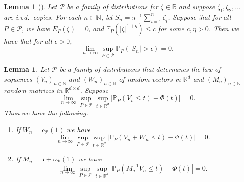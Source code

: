 \documentclass[aos]{imsart}
\renewcommand{\Pr}{\mathbb{P}}
\newcommand{\R}{\mathbb{R}}
\newcommand{\E}{\mathbb{E}}
\newtheorem{lemma}[theorem]{Lemma}
\begin{document}
	\begin{lemma}[{\citet[Supp. Lem.~19]{ShahGCM}}]
		\label{lem:uniformWLLN}
		Let $\mathcal{P}$ be a family of distributions for $\zeta\in\R$ and suppose $\zeta_1, \zeta_2,\dots$ are i.i.d.\ copies. For each $n\in\mathbb{N}$, let $S_n=n^{-1}\sum_{i=1}^n \zeta_i$. Suppose that for all $P\in\mathcal{P}$, we have $E_P(\zeta)=0$, and $\E_P(|\zeta|^{1+\eta})\leq c$ for some $c, \eta>0$. Then we have that for all $\epsilon>0$,
		\begin{equation*}
			\lim_{n\to\infty} \sup_{P\in\mathcal{P}} \Pr_P(|S_n|>\epsilon) = 0.
		\end{equation*}
	\end{lemma}
	
	\begin{lemma}
		\label{lem:uniformSlutsky}
		Let $\mathcal{P}$ be a family of distributions that determines the law of sequences $(V_n)_{n\in\mathbb{N}}$ and $(W_n)_{n\in\mathbb{N}}$ of random vectors in $\R^d$ and $(M_n)_{n\in\mathbb{N}}$ random matrices in $\R^{d\times d}$. Suppose \begin{equation*}
			\lim_{n\to\infty} \sup_{P\in\mathcal{P}} \sup_{t\in\R^d} |\Pr_P(V_n\leq t)-\Phi(t)| = 0.
		\end{equation*}
		Then we have the following.
		\begin{enumerate}[label=(\alph*)]
			\item If $W_n=o_\mathcal{P}(1)$ we have
			\begin{equation*}
				\lim_{n\to\infty} \sup_{P\in\mathcal{P}} \sup_{t\in\R^d} |\Pr_P(V_n + W_n\leq t)-\Phi(t)| = 0.
			\end{equation*}
			\item If $M_n= I + o_\mathcal{P}(1)$ we have \begin{equation*}\lim_{n\to\infty} \sup_{P\in\mathcal{P}} \sup_{t\in\R^d} |\Pr_P(M_n^{-1}V_n\leq t)-\Phi(t)| = 0.\end{equation*}
		\end{enumerate}
	\end{lemma}
\end{document}
